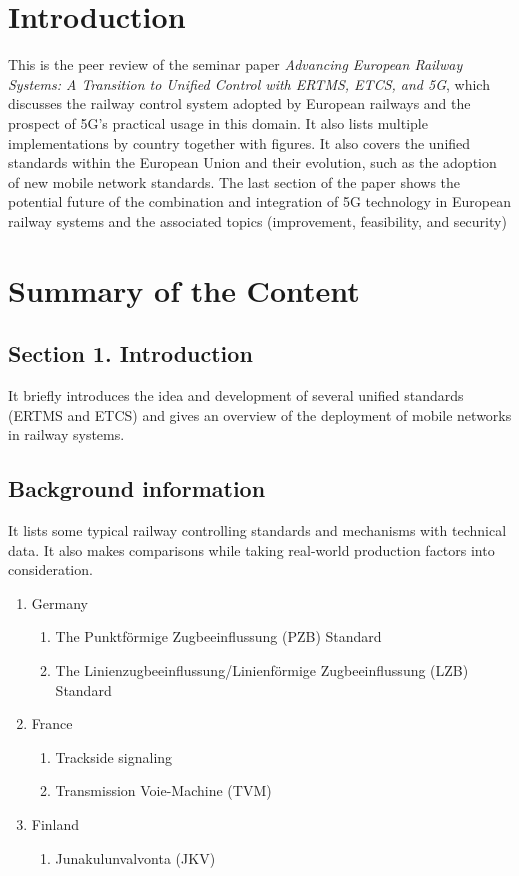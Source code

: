 \documentclass[a4paper,9pt]{scrartcl}
\title{\titletext}
\author{Guanru Chen}
\begin{document}
\maketitle
\section{Introduction}
This is the peer review of the seminar paper \textit{Advancing European Railway Systems: A Transition to Unified Control with ERTMS, ETCS, and 5G}, which discusses the railway control system adopted by European railways and the prospect of 5G's practical usage in this domain. It also lists multiple implementations by country together with figures. It also covers the unified standards within the European Union and their evolution, such as the adoption of new mobile network standards. The last section of the paper shows the potential future of the combination and integration of 5G technology in European railway systems and the associated topics (improvement, feasibility, and security)

\section{Summary of the Content}
\subsection{Section 1. Introduction}
It briefly introduces the idea and development of several unified standards (ERTMS and ETCS) and gives an overview of the deployment of mobile networks in railway systems.
\subsection{Background information}
It lists some typical railway controlling standards and mechanisms with technical data. It also makes comparisons while taking real-world production factors into consideration.
\begin{enumerate}[label=(\Alph*)]
    \item Germany
    \begin{enumerate}[label=(\Roman*),ref=(\Alph{enumi}-\Roman*)]
        \item The Punktförmige Zugbeeinflussung (PZB) Standard
        \item The Linienzugbeeinflussung/Linienförmige Zugbeeinflussung (LZB) Standard
    \end{enumerate}
    \item France
    \begin{enumerate}[label=(\Roman*),ref=(\Alph{enumi}-\Roman*)]
        \item Trackside signaling
        \item Transmission Voie-Machine (TVM)
    \end{enumerate}
    \item Finland
    \begin{enumerate}[label=(\Roman*),ref=(\Alph{enumi}-\Roman*)]
        \item Junakulunvalvonta (JKV)
    \end{enumerate}
\end{enumerate}
\end{document}
